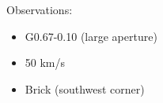 Observations:
\begin{itemize}
\item G0.67-0.10 (large aperture)
\item 50 km/s 
\item Brick (southwest corner)
\end{itemize}